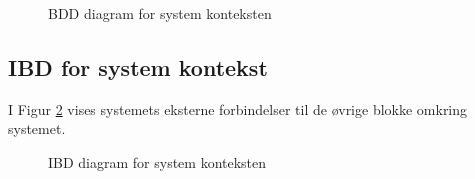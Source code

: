 \begin{figure}[h]
	\centering {}
	\caption{BDD diagram for system konteksten}
	\label{fig:bddcontext}
\end{figure}

\clearpage

\subsection{IBD for system kontekst}
I Figur \ref{fig:IBDsystemContext} vises systemets eksterne forbindelser til de øvrige blokke omkring systemet.

\begin{figure}[h]
	\centering {}
	\caption{IBD diagram for system konteksten}
	\label{fig:IBDsystemContext}
\end{figure}

